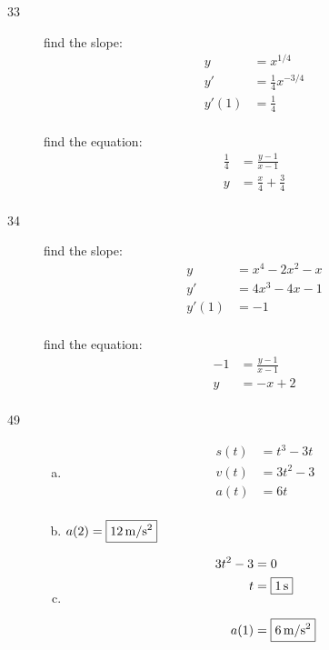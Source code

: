 \documentclass[letterpaper]{exam}
\begin{document}
\begin{description}
    \item[33] 
      find the slope: 
      \begin{align*}
        y     & = x^{1/4} \\
        y'    & = \frac{1}{4} x^{-3/4} \\
        y'(1) & = \frac{1}{4} \\
      \end{align*}

      find the equation:
      \begin{align*}
        \frac{1}{4} & = \frac{y - 1}{x - 1} \\
        y           & = \boxed{ \frac{x}{4} + \frac{3}{4} } \\
      \end{align*}

    \item[34] 
      find the slope: 
      \begin{align*}
        y     & = x^4 - 2x^2 - x \\
        y'    & = 4x^3 - 4x - 1 \\
        y'(1) & = -1 \\
      \end{align*}

      find the equation:
      \begin{align*}
        -1 & = \frac{y - 1}{x - 1} \\
        y  & = \boxed{ -x + 2 } \\
      \end{align*}
      
    \item[49]
      \begin{enumerate}[(a)]
        \item 
          \begin{align*}
            s(t) &= t^3 - 3t \\
            v(t) &= 3t^2 - 3 \\
            a(t) &= 6t \\
          \end{align*}

        \item $a(2) = \boxed{ \unit[12]{m/s^2} }$

        \item
          \begin{align*}
            3t^2 - 3 & = 0 \\
            t        & = \boxed{ \unit[1]{s} } \\
            \\
            a(1)     & = \boxed{ \unit[6]{m/s^2} } \\
          \end{align*}


\end{enumerate}
\end{description}
\end{document}
